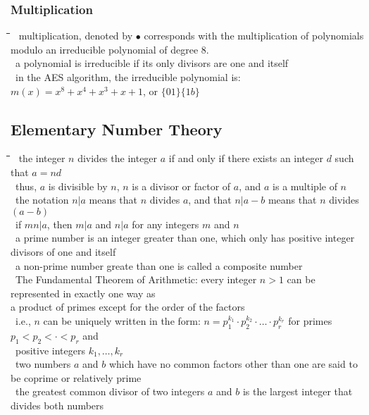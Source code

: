 \documentclass[10pt,letterpaper]{scrartcl}
\newcommand{\tbul}{\textbullet}
\newcommand{\tend}{\>\textendash}
\newcommand{\tabDef}{\hspace{2em}\=\hspace{2em}\=\hspace{2em}\=\hspace{2em}\=\kill}
\begin{document}
\subsubsection*{Multiplication}\begin{tabbing}\tabDef
\tbul\ multiplication, denoted by $\bullet$ corresponds with the multiplication of polynomials modulo an irreducible polynomial of degree 8. \\
    \tend\ a polynomial is irreducible if its only divisors are one and itself \\
\tbul\ in the AES algorithm, the irreducible polynomial is: $m(x)=x^8+x^4+x^3+x+1$, or $\{01\}\{1b\}$ \\

\subsection{Elementary Number Theory}\begin{tabbing}\tabDef
\tbul\ the integer $n$ divides the integer $a$ if and only if there exists an integer $d$ such that $a=nd$ \\
    \tend\ thus, $a$ is divisible by $n$, $n$ is a divisor or factor of $a$, and $a$ is a multiple of $n$ \\
    \tend\ the notation $n|a$ means that $n$ divides $a$, and that $n|a-b$ means that $n$ divides $(a-b)$ \\
\tbul\ if $mn|a$, then $m|a$ and $n|a$ for any integers $m$ and $n$ \\
\tbul\ a prime number is an integer greater than one, which only has positive integer divisors of one and itself \\
    \tend\ a non-prime number greate than one is called a composite number \\
\tbul\ The Fundamental Theorem of Arithmetic: every integer $n>1$ can be represented in exactly one way as \\ a product of primes except for the order of the factors \\
    \tend\ i.e., $n$ can be uniquely written in the form: $n=p_1^{k_1}\cdot p_2^{k_2}\cdot\ldots\cdot p_r^{k_r}$ for primes $p_1 < p_2 < \cdot < p_r$ and \\ \>\ positive integers $k_1,\ldots ,k_r$ \\
\tbul\ two numbers $a$ and $b$ which have no common factors other than one are said to be coprime or relatively prime \\
\tbul\ the greatest common divisor of two integers $a$ and $b$ is the largest integer that divides both numbers \\

\end{tabbing}
\end{tabbing}
\end{document}
